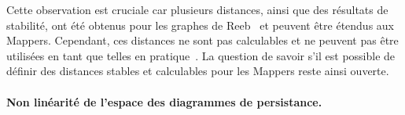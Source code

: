   
Cette observation est cruciale car plusieurs distances, ainsi que des r\'esultats de stabilit\'e, ont \'et\'e obtenus 
pour les graphes de Reeb~\cite{Bauer16,Bauer14,deSilva16} et peuvent \^etre \'etendus aux Mappers.
Cependant, ces distances ne sont pas calculables et ne peuvent pas \^etre utilis\'ees en tant que telles en pratique~\cite{Agarwal15}.
La question de savoir s'il est possible de d\'efinir des distances stables et calculables pour les Mappers reste ainsi ouverte.



  

\paragraph*{Non lin\'earit\'e de l'espace des diagrammes de persistance.}

